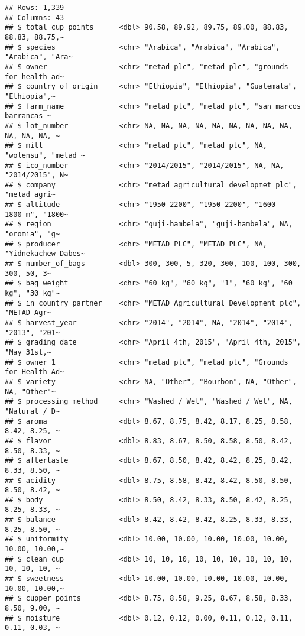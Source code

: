 \documentclass[
]{article}
\begin{document}
\begin{verbatim}
## Rows: 1,339
## Columns: 43
## $ total_cup_points      <dbl> 90.58, 89.92, 89.75, 89.00, 88.83, 88.83, 88.75,~
## $ species               <chr> "Arabica", "Arabica", "Arabica", "Arabica", "Ara~
## $ owner                 <chr> "metad plc", "metad plc", "grounds for health ad~
## $ country_of_origin     <chr> "Ethiopia", "Ethiopia", "Guatemala", "Ethiopia",~
## $ farm_name             <chr> "metad plc", "metad plc", "san marcos barrancas ~
## $ lot_number            <chr> NA, NA, NA, NA, NA, NA, NA, NA, NA, NA, NA, NA, ~
## $ mill                  <chr> "metad plc", "metad plc", NA, "wolensu", "metad ~
## $ ico_number            <chr> "2014/2015", "2014/2015", NA, NA, "2014/2015", N~
## $ company               <chr> "metad agricultural developmet plc", "metad agri~
## $ altitude              <chr> "1950-2200", "1950-2200", "1600 - 1800 m", "1800~
## $ region                <chr> "guji-hambela", "guji-hambela", NA, "oromia", "g~
## $ producer              <chr> "METAD PLC", "METAD PLC", NA, "Yidnekachew Dabes~
## $ number_of_bags        <dbl> 300, 300, 5, 320, 300, 100, 100, 300, 300, 50, 3~
## $ bag_weight            <chr> "60 kg", "60 kg", "1", "60 kg", "60 kg", "30 kg"~
## $ in_country_partner    <chr> "METAD Agricultural Development plc", "METAD Agr~
## $ harvest_year          <chr> "2014", "2014", NA, "2014", "2014", "2013", "201~
## $ grading_date          <chr> "April 4th, 2015", "April 4th, 2015", "May 31st,~
## $ owner_1               <chr> "metad plc", "metad plc", "Grounds for Health Ad~
## $ variety               <chr> NA, "Other", "Bourbon", NA, "Other", NA, "Other"~
## $ processing_method     <chr> "Washed / Wet", "Washed / Wet", NA, "Natural / D~
## $ aroma                 <dbl> 8.67, 8.75, 8.42, 8.17, 8.25, 8.58, 8.42, 8.25, ~
## $ flavor                <dbl> 8.83, 8.67, 8.50, 8.58, 8.50, 8.42, 8.50, 8.33, ~
## $ aftertaste            <dbl> 8.67, 8.50, 8.42, 8.42, 8.25, 8.42, 8.33, 8.50, ~
## $ acidity               <dbl> 8.75, 8.58, 8.42, 8.42, 8.50, 8.50, 8.50, 8.42, ~
## $ body                  <dbl> 8.50, 8.42, 8.33, 8.50, 8.42, 8.25, 8.25, 8.33, ~
## $ balance               <dbl> 8.42, 8.42, 8.42, 8.25, 8.33, 8.33, 8.25, 8.50, ~
## $ uniformity            <dbl> 10.00, 10.00, 10.00, 10.00, 10.00, 10.00, 10.00,~
## $ clean_cup             <dbl> 10, 10, 10, 10, 10, 10, 10, 10, 10, 10, 10, 10, ~
## $ sweetness             <dbl> 10.00, 10.00, 10.00, 10.00, 10.00, 10.00, 10.00,~
## $ cupper_points         <dbl> 8.75, 8.58, 9.25, 8.67, 8.58, 8.33, 8.50, 9.00, ~
## $ moisture              <dbl> 0.12, 0.12, 0.00, 0.11, 0.12, 0.11, 0.11, 0.03, ~

\end{verbatim}
\end{document}

